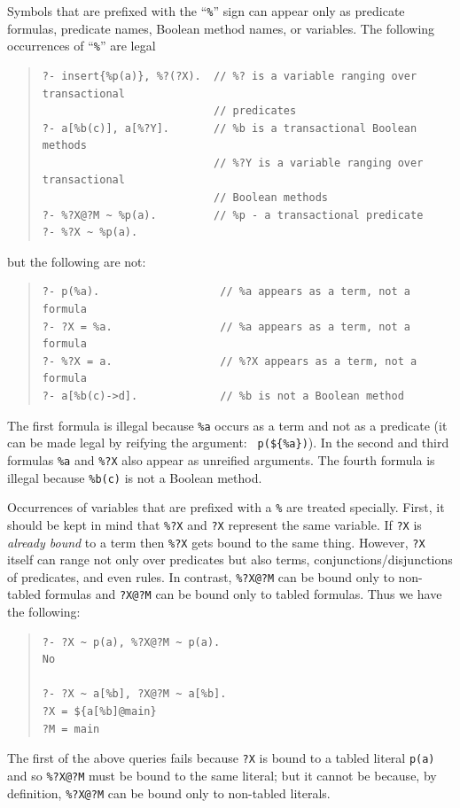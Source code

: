 \documentclass[11pt]{article}
\begin{document}
Symbols that are prefixed with the ``\verb|%|'' sign
can appear only as predicate formulas, predicate names, Boolean
method names, or variables.  
The following occurrences of ``\verb|%|'' are legal
\begin{quote}
\begin{verbatim}
?- insert{%p(a)}, %?(?X).  // %? is a variable ranging over transactional 
                           // predicates
?- a[%b(c)], a[%?Y].       // %b is a transactional Boolean methods
                           // %?Y is a variable ranging over transactional
                           // Boolean methods
?- %?X@?M ~ %p(a).         // %p - a transactional predicate
?- %?X ~ %p(a).

\end{verbatim}
\end{quote}
but the following are not:
\begin{quote}
\begin{verbatim}
?- p(%a).                   // %a appears as a term, not a formula
?- ?X = %a.                 // %a appears as a term, not a formula
?- %?X = a.                 // %?X appears as a term, not a formula
?- a[%b(c)->d].             // %b is not a Boolean method
\end{verbatim}
\end{quote}
The first formula is illegal because {\tt \%a} occurs as a term and not
as a predicate (it can be made legal by reifying the argument: {\tt
p(\$\{\%a\})}). In the second and third formulas {\tt \%a} and {\tt \%?X}
also appear as unreified arguments. The fourth formula is illegal
because {\tt \%b(c)} is not a Boolean method. 

Occurrences of variables that are prefixed with  a {\tt \%} are treated
specially.  First, it should be kept in mind that {\tt \%?X} and {\tt ?X}
represent the same variable.  If {\tt ?X} is \emph{already bound} to
a term then {\tt \%?X} gets bound to the same thing.  However, {\tt ?X}
itself can range not only over predicates but also terms,
conjunctions/disjunctions of predicates, and even rules. In contrast,
{\tt \%?X@?M} can be bound only to non-tabled
formulas and {\tt ?X@?M} can be bound only to
tabled formulas.  Thus we have the following:
\begin{quote}
\begin{verbatim}
?- ?X ~ p(a), %?X@?M ~ p(a).
No

?- ?X ~ a[%b], ?X@?M ~ a[%b].  
?X = ${a[%b]@main}
?M = main
\end{verbatim}
\end{quote}
The first of the above queries fails because \texttt{?X} is bound to a
tabled literal \texttt{p(a)} and so \texttt{\%?X@?M} must be bound to the
same literal; but it cannot be because, by definition, \texttt{\%?X@?M} can
be bound only to non-tabled literals.    
\end{document}
